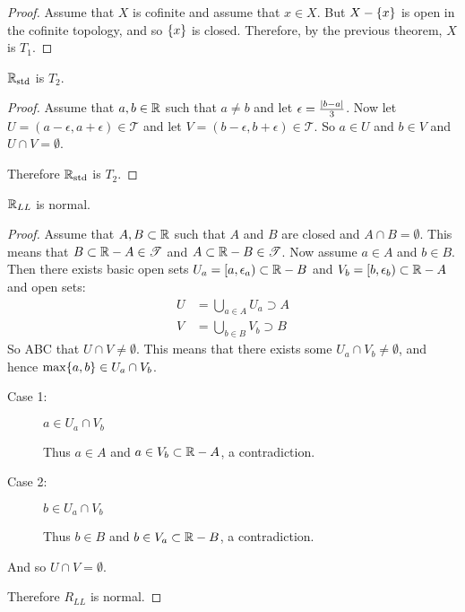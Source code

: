 \documentclass[letterpaper,12pt,fleqn]{article}
\newcommand{\T}{\mathscr{T}}
\newcommand{\e}{\epsilon}
\begin{document}
\begin{proof}
  Assume that \(X\) is cofinite and assume that \(x\in X\).  But \(X-\{x\}\) is open in the cofinite topology, and
  so \(\{x\}\) is closed.  Therefore, by the previous theorem, \(X\) is \(T_1\).
\end{proof}

\begin{theorem}
  \(\mathbb{R}_{\text{std}}\) is \(T_2\).
\end{theorem}

\begin{proof}
  Assume that \(a,b\in\mathbb{R}\) such that \(a\ne b\) and let \(\e=\frac{\abs{b-a}}{3}\).  Now let \(U=(a-\e,a+\e)\in\T\)
  and let \(V=(b-\e,b+\e)\in\T\).  So \(a\in U\) and \(b\in V\) and \(U\cap V=\emptyset\).

  Therefore \(\mathbb{R}_{\text{std}}\) is \(T_2\).
\end{proof}

\begin{theorem}
  \(\mathbb{R}_{LL}\) is normal.
\end{theorem}

\begin{proof}
  Assume that \(A,B\subset\mathbb{R}\) such that \(A\) and \(B\) are closed and \(A\cap B=\emptyset\).  This means that
  \(B\subset\R-A\in\T\) and \(A\subset\R-B\in\T\).  Now assume \(a\in A\) and \(b\in B\).  Then there exists basic
  open sets \(U_a=[a,\e_a)\subset\R-B\) and \(V_b=[b,\e_b)\subset\R-A\) and open sets:
  \begin{align*}
    U &= \bigcup_{a\in A}U_a\supset A \\
    V &= \bigcup_{b\in B}V_b\supset B
  \end{align*}
  So ABC that \(U\cap V\ne\emptyset\).  This means that there exists some \(U_a\cap V_b\ne\emptyset\), and hence
  \(\max\{a,b\}\in U_a\cap V_b\).

  \begin{description}
  \item[Case 1:] \(a\in U_a\cap V_b\)

    Thus \(a\in A\) and \(a\in V_b\subset\mathbb{R}-A\), a contradiction.

  \item[Case 2:] \(b\in U_a\cap V_b\)

    Thus \(b\in B\) and \(b\in V_a\subset\mathbb{R}-B\), a contradiction.
  \end{description}

  And so \(U\cap V=\emptyset\).

  Therefore \(R_{LL}\) is normal.
\end{proof}
\end{document}
